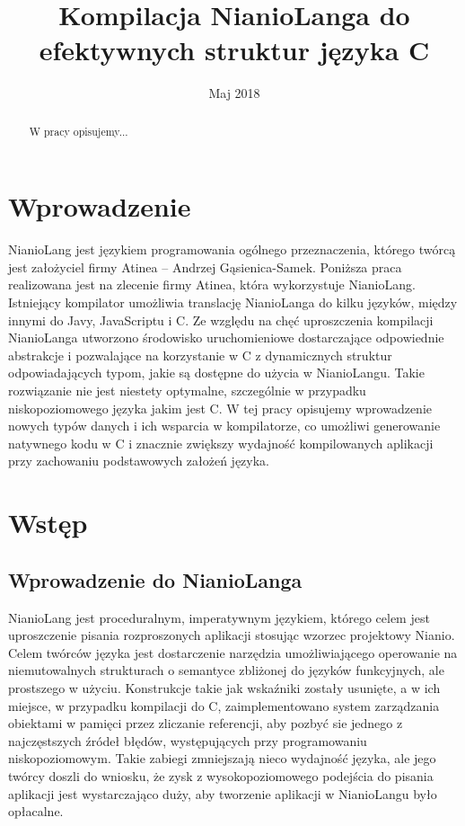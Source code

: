 \documentclass[licencjacka]{pracamgr}
\title{Kompilacja NianioLanga do efektywnych struktur języka C}
\date{Maj 2018}
\begin{document}
\maketitle

\begin{abstract}
W pracy opisujemy...
\end{abstract}

\tableofcontents

\chapter*{Wprowadzenie}
  NianioLang jest językiem programowania ogólnego przeznaczenia, którego twórcą jest
  założyciel firmy Atinea -- Andrzej Gąsienica-Samek. Poniższa praca realizowana jest
  na zlecenie firmy Atinea, która wykorzystuje NianioLang.
  Istniejący kompilator umożliwia translację NianioLanga do kilku języków,
  między innymi do Javy, JavaScriptu i C.
  Ze względu na chęć uproszczenia kompilacji NianioLanga
  utworzono środowisko uruchomieniowe dostarczające odpowiednie abstrakcje
  i pozwalające na korzystanie w C z dynamicznych struktur odpowiadających typom,
  jakie są dostępne do użycia w NianioLangu. Takie rozwiązanie nie jest
  niestety optymalne, szczególnie w przypadku niskopoziomowego języka jakim
  jest C. W tej pracy opisujemy wprowadzenie nowych typów danych i ich wsparcia
  w kompilatorze, co umożliwi generowanie natywnego kodu w C i znacznie
  zwiększy wydajność kompilowanych aplikacji przy zachowaniu podstawowych założeń języka.
\chapter{Wstęp}
\section{Wprowadzenie do NianioLanga}
NianioLang jest proceduralnym, imperatywnym językiem, którego celem jest
uproszczenie pisania rozproszonych aplikacji stosując wzorzec projektowy
Nianio\cite{wzorzec_nianio}.
Celem twórców języka jest dostarczenie narzędzia umożliwiającego operowanie na niemutowalnych strukturach
o semantyce zbliżonej do języków funkcyjnych, ale prostszego w użyciu.
Konstrukcje takie jak wskaźniki zostały usunięte, a w ich miejsce, w przypadku kompilacji do C,
zaimplementowano system zarządzania obiektami
w pamięci przez zliczanie referencji, aby pozbyć sie jednego z najczęstszych źródeł błędów, występujących przy programowaniu niskopoziomowym.
Takie zabiegi zmniejszają nieco wydajność języka, ale jego twórcy doszli do wniosku, że zysk z wysokopoziomowego podejścia
do pisania aplikacji jest wystarczająco duży, aby tworzenie aplikacji w NianioLangu było opłacalne.
\end{document}
